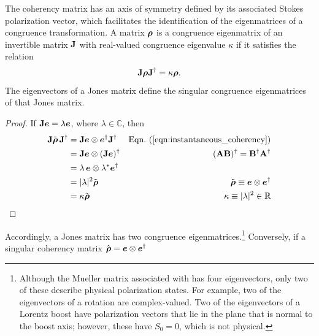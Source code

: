 The coherency matrix has an axis of symmetry defined by its associated Stokes polarization vector, which facilitates the identification of the eigenmatrices of a congruence transformation.
%
A matrix $\mbox{\boldmath $\rho$}$ is a congruence eigenmatrix of an invertible matrix ${\bf J}$ with real-valued congruence eigenvalue $\kappa$ if it satisfies the relation
%
\begin{equation}
{\bf J}\mbox{\boldmath $\rho$}{\bf J}^\dagger = \kappa \mbox{\boldmath $\rho$}.
\end{equation}
%
The eigenvectors of a Jones matrix define the singular congruence eigenmatrices of that Jones matrix.
%
\begin{proof}
\label{proof:eigenvector_to_eigenmatrix}
If ${\bf J} \mbox{\boldmath $e$} = \lambda \mbox{\boldmath $e$}$, where $\lambda \in \mathbb{C}$, then
\begin{align*}
\JM{J}\tilde{\cohM{\rho}}\,\JM{J}^\dagger
&= \JM{J} \Jcol{e} \otimes \Jcol{e}^\dagger \JM{J}^\dagger
    & \peqn{instantaneous_coherency} \\
&= \JM{J} \Jcol{e} \otimes  (\JM{J}\Jcol{e})^\dagger 
    & (\JM{A}\JM{B})^\dagger = \JM{B}^\dagger \JM{A}^\dagger \\
&= \lambda \, \Jcol{e} \otimes \lambda^* \Jcol{e}^\dagger \\
&= |\lambda|^2 \tilde{\cohM{\rho}} & \tilde{\cohM{\rho}} \equiv \Jcol{e} \otimes \Jcol{e}^\dagger \\
&= \kappa \tilde{\cohM{\rho}} & \kappa \equiv |\lambda|^2 \in \mathbb{R}
\end{align*}
\end{proof}
%
\noindent
Accordingly, a Jones matrix has two congruence eigenmatrices.\footnote{
%
Although the Mueller matrix associated with 
has four eigenvectors, only two of these
describe physical polarization states.
%
For example, two of the eigenvectors of a rotation are complex-valued.  
%
Two of the eigenvectors of a Lorentz boost have polarization vectors that lie 
in the plane that is normal to the boost axis; however, these have $S_0 = 0$, which is not physical.   }
%
%
%
%
Conversely, if a singular coherency matrix
%
$\hat{\mbox{\boldmath $\rho$}}=\mbox{\boldmath $e$} \otimes \mbox{\boldmath $e$}^\dagger$ 
